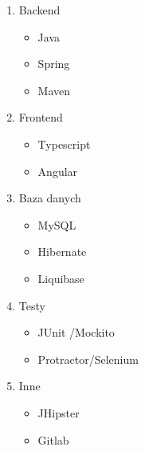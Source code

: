 \begin{enumerate}
    \item Backend
    \begin{itemize}
        \item Java \cite{java}
        \item Spring \cite{spring}
        \item Maven \cite{maven}
    \end{itemize}

    \item Frontend
    \begin{itemize}
        \item Typescript \cite{typescript}
        \item Angular \cite{angular}
    \end{itemize}

    \item Baza danych
    \begin{itemize}
        \item MySQL \cite{mysql}
        \item Hibernate \cite{hibernate}
        \item Liquibase \cite{liquibase}
    \end{itemize}

    \item Testy
    \begin{itemize}
        \item JUnit \cite{junit} /Mockito
        \item Protractor/Selenium
    \end{itemize}

    \item Inne
    \begin{itemize}
        \item JHipster
        \item Gitlab
    \end{itemize}
\end{enumerate}

\thispagestyle{normal}
